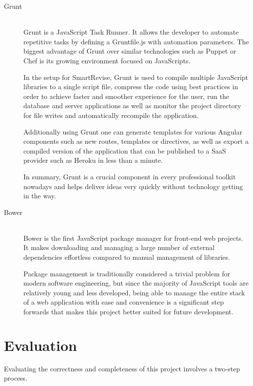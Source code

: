 \documentclass[bsc,frontabs,twoside,singlespacing,parskip]{infthesis}     %
\begin{document}
		\begin{description}
			\item[Grunt] \hfill \\
			Grunt is a JavaScript Task Runner. It allows the developer to automate repetitive tasks by defining a Gruntfile.js with automation parameters. The biggest advantage of Grunt over similar technologies such as Puppet or Chef is its growing environment focused on JavaScripts.

			In the setup for SmartRevise, Grunt is used to compile multiple JavaScript libraries to a single script file, compress the code using best practices in order to achieve faster and smoother experience for the user, run the database and server applications as well as monitor the project directory for file writes and automatically recompile the application.

			Additionally using Grunt one can generate templates for various Angular components such as new routes, templates or directives, as well as export a compiled version of the application that can be published to a SaaS provider such as Heroku in less than a minute.

			In summary, Grunt is a crucial component in every professional toolkit nowadays and helps deliver ideas very quickly without technology getting in the way.

			\item[Bower] \hfill \\
			Bower is the first JavaScript package manager for front-end web projects. It makes downloading and managing a large number of external dependencies effortless compared to manual management of libraries.

			Package management is traditionally considered a trivial problem for modern software engineering, but since the majority of JavaScript tools are relatively young and less developed, being able to manage the entire stack of a web application with ease and convenience is a significant step forwards that makes this project better suited for future development.

		\end{description}




\chapter{Evaluation}

	Evaluating the correctness and completeness of this project involves a two-step process.
\end{document}
